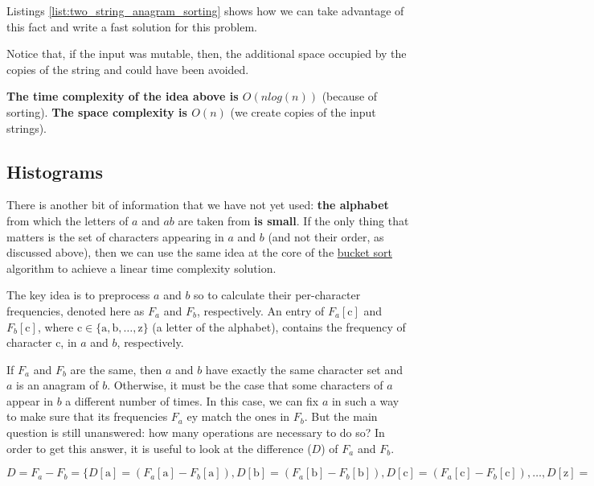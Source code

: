 Listings \ref{list:two_string_anagram_sorting}  shows how we can take advantage of this fact and write a fast solution for this problem.

 	

Notice that, if the input was mutable, then, the additional space occupied by the copies of the string  and 
could have been avoided. 
	 
\textbf{The time complexity of the idea above is $O(n log(n))$} (because of sorting). \textbf{The space complexity is $O(n)$} (we create copies of the input strings).
	 
		  

\subsection{Histograms}
\label{sec:anagrams:histograms}

There is another bit of information that we have not  yet used: \textbf{the alphabet} from which the
letters of $a$ and $ab$ are taken from \textbf{is small}. 
If the only thing that matters is the set of characters appearing in $a$ and $b$ (and not their order, as discussed above),
then we can use the same idea at the core of the \href{https://en.wikipedia.org/wiki/Bucket_sort}{bucket sort} algorithm to achieve a linear time complexity solution.

The key idea is to preprocess $a$ and $b$ so to calculate their per-character frequencies, denoted here as $F_a$ and $F_b$, respectively. An entry of $F_a[\mathrm{c}]$ and $F_b[\mathrm{c}]$, where $\mathrm{c} \in \{\mathrm{a},\mathrm{b},\ldots,\mathrm{z}\}$ (a letter of the alphabet), contains the frequency of character $\mathrm{c}$, in $a$ and $b$, respectively.

If $F_a$ and $F_b$ are the same, then $a$ and $b$ have exactly the same character set and $a$ is an anagram of $b$.
Otherwise, it must be the case that some characters of $a$ appear in $b$ a different number of times.
In this case, we can fix $a$ in such a way to make sure that its frequencies $F_a$ ey match the ones in $F_b$. 
But the main question is still unanswered: how many operations are necessary to do so?  In order to get this answer, it is useful to look at
the difference ($D$) of $F_a$ and $F_b$.

$D = F_a - F_b = \{D[\mathrm{a}] = (F_a[\mathrm{a}] - F_b[\mathrm{a}]), D[\mathrm{b}] = (F_a[\mathrm{b}] - F_b[\mathrm{b}]), D[\mathrm{c}] = (F_a[\mathrm{c}] - F_b[\mathrm{c}]), \ldots, D[\mathrm{z}] = (F_a[\mathrm{z}] - F_b[\mathrm{z}])\}
$


